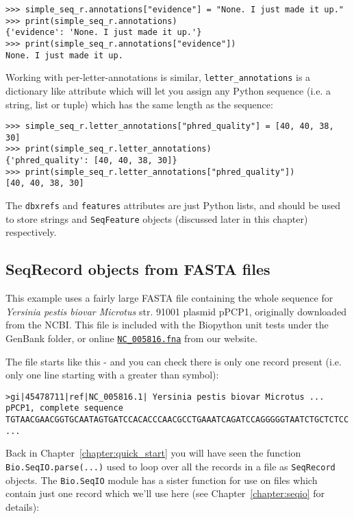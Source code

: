 \begin{verbatim}
>>> simple_seq_r.annotations["evidence"] = "None. I just made it up."
>>> print(simple_seq_r.annotations)
{'evidence': 'None. I just made it up.'}
>>> print(simple_seq_r.annotations["evidence"])
None. I just made it up.
\end{verbatim}

Working with per-letter-annotations is similar, \verb|letter_annotations| is a
dictionary like attribute which will let you assign any Python sequence (i.e.
a string, list or tuple) which has the same length as the sequence:

\begin{verbatim}
>>> simple_seq_r.letter_annotations["phred_quality"] = [40, 40, 38, 30]
>>> print(simple_seq_r.letter_annotations)
{'phred_quality': [40, 40, 38, 30]}
>>> print(simple_seq_r.letter_annotations["phred_quality"])
[40, 40, 38, 30]
\end{verbatim}

The \verb|dbxrefs| and \verb|features| attributes are just Python lists, and
should be used to store strings and \verb|SeqFeature| objects (discussed later
in this chapter) respectively.


\subsection{SeqRecord objects from FASTA files}

This example uses a fairly large FASTA file containing the whole sequence for \textit{Yersinia pestis biovar Microtus} str. 91001 plasmid pPCP1, originally downloaded from the NCBI.  This file is included with the Biopython unit tests under the GenBank folder, or online \href{https://raw.githubusercontent.com/biopython/biopython/master/Tests/GenBank/NC_005816.fna}{\texttt{NC\_005816.fna}} from our website.

The file starts like this - and you can check there is only one record present (i.e. only one line starting with a greater than symbol):

\begin{verbatim}
>gi|45478711|ref|NC_005816.1| Yersinia pestis biovar Microtus ... pPCP1, complete sequence
TGTAACGAACGGTGCAATAGTGATCCACACCCAACGCCTGAAATCAGATCCAGGGGGTAATCTGCTCTCC
...
\end{verbatim}

Back in Chapter~\ref{chapter:quick_start} you will have seen the function \verb|Bio.SeqIO.parse(...)|
used to loop over all the records in a file as \verb|SeqRecord| objects. The \verb|Bio.SeqIO| module
has a sister function for use on files which contain just one record which we'll use here (see Chapter~\ref{chapter:seqio} for details):

